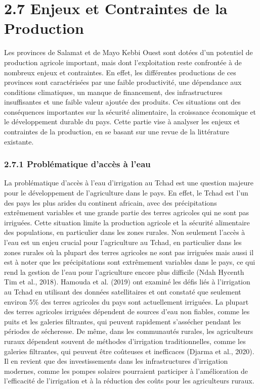 \documentclass[12pt,oneside]{report}
\begin{document}
\chapter{2.7 Enjeux et Contraintes de la Production}
Les provinces de Salamat et de Mayo Kebbi Ouest sont dotées d'un potentiel de production agricole important, mais dont l'exploitation reste confrontée à de nombreux enjeux et contraintes. En effet, les différentes productions de ces provinces sont caractérisées par une faible productivité, une dépendance aux conditions climatiques, un manque de financement, des infrastructures insuffisantes et une faible valeur ajoutée des produits. Ces situations ont des conséquences importantes sur la sécurité alimentaire, la croissance économique et le développement durable du pays. Cette partie vise à analyser les enjeux et contraintes de la production, en se basant sur une revue de la littérature existante.

\subsection{2.7.1 Problématique d'accès à l'eau}
La problématique d'accès à l'eau d'irrigation au Tchad est une question majeure pour le développement de l'agriculture dans le pays. En effet, le Tchad est l'un des pays les plus arides du continent africain, avec des précipitations extrêmement variables et une grande partie des terres agricoles qui ne sont pas irriguées. Cette situation limite la production agricole et la sécurité alimentaire des populations, en particulier dans les zones rurales. Non seulement l'accès à l'eau est un enjeu crucial pour l'agriculture au Tchad, en particulier dans les zones rurales où la plupart des terres agricoles ne sont pas irriguées mais aussi il est à noter que les précipitations sont extrêmement variables dans le pays, ce qui rend la gestion de l'eau pour l'agriculture encore plus difficile (Ndah Hycenth Tim et al., 2018). Hamouda et al. (2019) ont examiné les défis liés à l'irrigation au Tchad en utilisant des données satellitaires et ont constaté que seulement environ 5\% des terres agricoles du pays sont actuellement irriguées. La plupart des terres agricoles irriguées dépendent de sources d'eau non fiables, comme les puits et les galeries filtrantes, qui peuvent rapidement s'assécher pendant les périodes de sécheresse. De même, dans les communautés rurales, les agriculteurs ruraux dépendent souvent de méthodes d'irrigation traditionnelles, comme les galeries filtrantes, qui peuvent être coûteuses et inefficaces (Djarma et al., 2020). Il en revient que des investissements dans les infrastructures d'irrigation modernes, comme les pompes solaires pourraient participer à l’amélioration de l'efficacité de l'irrigation et à la réduction des coûts pour les agriculteurs ruraux.
\end{document}
